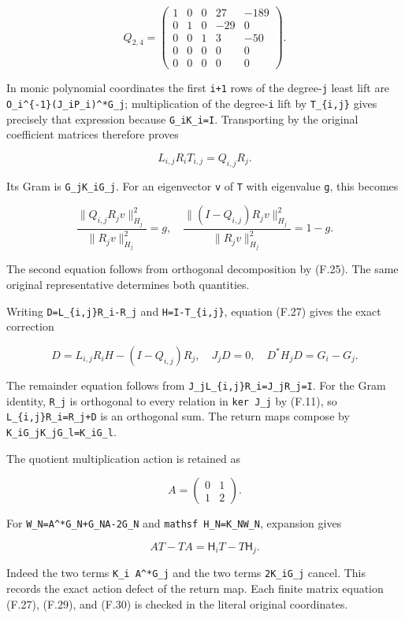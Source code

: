 \[
Q_{2,4}=\begin{pmatrix}
1&0&0&27&-189\\0&1&0&-29&0\\0&0&1&3&-50\\
0&0&0&0&0\\0&0&0&0&0
\end{pmatrix}.
\tag{F.26}
\]

In monic polynomial coordinates the first \nolinkurl{i+1} rows of the degree-\nolinkurl{j} least lift are \texttt{O\_i\^{}\{-1\}(J\_iP\_i)\^{}*G\_j}; multiplication of the degree-\nolinkurl{i} lift by \texttt{T\_\{i,j\}} gives precisely that expression because \nolinkurl{G_iK_i=I}. Transporting by the original coefficient matrices therefore proves

\[
\boxed{L_{i,j}R_iT_{i,j}=Q_{i,j}R_j.}
\tag{F.27}
\]

Its Gram is \nolinkurl{G_jK_iG_j}. For an eigenvector \nolinkurl{v} of \nolinkurl{T} with eigenvalue \nolinkurl{g}, this becomes

\[
\frac{\|Q_{i,j}R_jv\|_{H_j}^2}{\|R_jv\|_{H_j}^2}=g,
\quad
\frac{\|(I-Q_{i,j})R_jv\|_{H_j}^2}{\|R_jv\|_{H_j}^2}=1-g.
\tag{F.28}
\]

The second equation follows from orthogonal decomposition by (F.25). The same original representative determines both quantities.

Writing \texttt{D=L\_\{i,j\}R\_i-R\_j} and \texttt{H=I-T\_\{i,j\}}, equation (F.27) gives the exact correction

\[
D=L_{i,j}R_iH-(I-Q_{i,j})R_j,
\quad J_jD=0,
\quad D^*H_jD=G_i-G_j.
\tag{F.29}
\]

The remainder equation follows from \texttt{J\_jL\_\{i,j\}R\_i=J\_jR\_j=I}. For the Gram identity, \nolinkurl{R_j} is orthogonal to every relation in \texttt{ker\ J\_j} by (F.11), so \texttt{L\_\{i,j\}R\_i=R\_j+D} is an orthogonal sum. The return maps compose by \nolinkurl{K_iG_jK_jG_l=K_iG_l}.

The quotient multiplication action is retained as

\[
A=\begin{pmatrix}0&1\\1&2\end{pmatrix}.
\]

For \texttt{W\_N=A\^{}*G\_N+G\_NA-2G\_N} and \texttt{mathsf\ H\_N=K\_NW\_N}, expansion gives

\[
AT-TA=\mathsf H_iT-T\mathsf H_j.
\tag{F.30}
\]

Indeed the two terms \texttt{K\_i\ A\^{}*G\_j} and the two terms \nolinkurl{2K_iG_j} cancel. This records the exact action defect of the return map. Each finite matrix equation (F.27), (F.29), and (F.30) is checked in the literal original coordinates.


